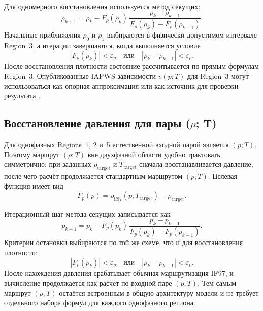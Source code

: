 Для одномерного восстановления используется метод секущих:
\begin{equation}
\rho_{k+1} = \rho_{k}
- F_{\rho}(\rho_{k})\,
\frac{\rho_{k}-\rho_{k-1}}
{F_{\rho}(\rho_{k})-F_{\rho}(\rho_{k-1})}.
\end{equation}
Начальные приближения $\rho_{0}$ и $\rho_{1}$
выбираются в физически допустимом интервале Region~3,
а итерации завершаются,
когда выполняется условие
\begin{equation}
|F_{\rho}(\rho_{k})| < \varepsilon_{p}
\quad \mbox{или} \quad
|\rho_{k}-\rho_{k-1}| < \varepsilon_{\rho}.
\end{equation}
После восстановления плотности
состояние рассчитывается по прямым формулам Region~3.
Опубликованные IAPWS зависимости $v(p; T)$ для Region~3
могут использоваться как опорная аппроксимация
или как источник для проверки результата \cite{iapws_vpt_region3}.

\subsection{Восстановление давления для пары (\texorpdfstring{$\rho$}{rho}; T)}

Для однофазных Regions~1, 2 и~5
естественной входной парой является $(p; T)$.
Поэтому маршрут $(\rho; T)$
вне двухфазной области удобно трактовать симметрично:
при заданных $\rho_{\mathrm{target}}$ и $T_{\mathrm{target}}$
сначала восстанавливается давление,
после чего расчёт продолжается стандартным маршрутом $(p; T)$.
Целевая функция имеет вид
\begin{equation}
F_{p}(p) = \rho_{\mathrm{if97}}(p; T_{\mathrm{target}}) - \rho_{\mathrm{target}}.
\end{equation}

Итерационный шаг метода секущих записывается как
\begin{equation}
p_{k+1} = p_{k}
- F_{p}(p_{k})\,
\frac{p_{k}-p_{k-1}}
{F_{p}(p_{k})-F_{p}(p_{k-1})}.
\end{equation}
Критерии остановки выбираются по той же схеме,
что и для восстановления плотности:
\begin{equation}
|F_{p}(p_{k})| < \varepsilon_{\rho}
\quad \mbox{или} \quad
|p_{k}-p_{k-1}| < \varepsilon_{p}.
\end{equation}
После нахождения давления
срабатывает обычная маршрутизация IF97,
и вычисление продолжается как расчёт по входной паре $(p; T)$.
Тем самым маршрут $(\rho; T)$
остаётся встроенным в общую архитектуру модели
и не требует отдельного набора формул
для каждого однофазного региона.


